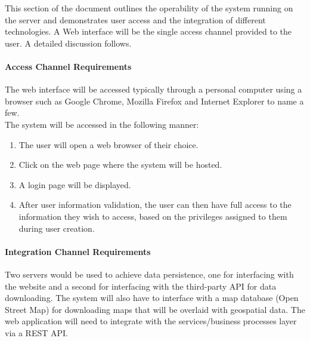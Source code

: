 This section of the document outlines the operability of the system running on the server and demonstrates user access and the integration of different technologies. A Web interface will be the single access channel provided to the user. A detailed discussion follows.
\paragraph{Access Channel Requirements}
The web interface will be accessed typically through a personal computer using a browser such as Google Chrome, Mozilla Firefox and Internet Explorer to name a few.\\
The system will be accessed in the following manner:
\begin{enumerate}
	\item The user will open a web browser of their choice.
	\item Click on the web page where the system will be hosted.
	\item A login page will be displayed.
	\item After user information validation, the user can then have full access to the information they wish to access, based on the privileges assigned to them during user creation.
\end{enumerate}
\paragraph{Integration Channel Requirements}
Two servers would be used to achieve data persistence, one for interfacing with the website and a second for interfacing with the third-party API for data downloading. The system will also have to interface with a map database (Open Street Map) for downloading maps that will be overlaid with geospatial data. The web application will need to integrate with the services/business processes layer via a REST API.
